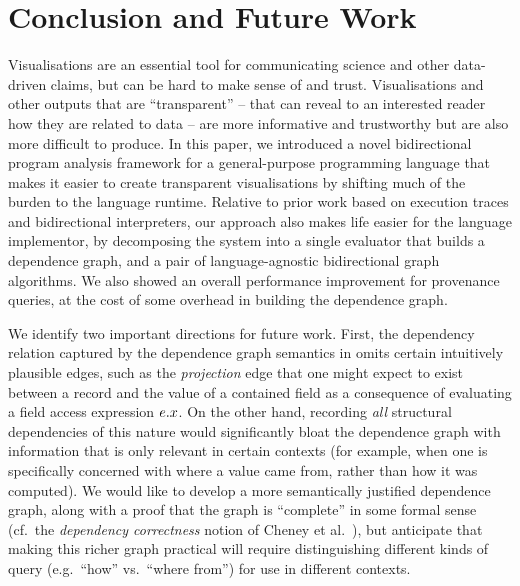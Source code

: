 \section{Conclusion and Future Work}
\label{sec:conclusion}

Visualisations are an essential tool for communicating science and other data-driven claims, but can be hard
to make sense of and trust. Visualisations and other outputs that are ``transparent'' -- that can reveal to an
interested reader how they are related to data -- are more informative and trustworthy but are also more difficult
to produce. In this paper, we introduced a novel bidirectional program analysis framework for a
general-purpose programming language that makes it easier to create transparent visualisations by shifting
much of the burden to the language runtime. Relative to prior work based on execution traces and bidirectional
interpreters, our approach also makes life easier for the language implementor, by decomposing the system into
a single evaluator that builds a dependence graph, and a pair of language-agnostic bidirectional graph
algorithms. We also showed an overall performance improvement for provenance queries, at the cost of some
overhead in building the dependence graph.


We identify two important directions for future work. First, the dependency relation captured by the
dependence graph semantics in  omits certain intuitively plausible edges, such as the
\emph{projection} edge that one might expect to exist between a record and the value of a contained field as a
consequence of evaluating a field access expression $e.x$. On the other hand, recording
\emph{all} structural dependencies of this nature would significantly bloat the dependence graph with
information that is only relevant in certain contexts (for example, when one is specifically concerned with
where a value came from, rather than how it was computed). We would like to develop a more semantically
justified dependence graph, along with a proof that the graph is ``complete'' in some formal sense (cf.~the
\emph{dependency correctness} notion of Cheney et al.~\cite{cheney11b}), but anticipate that making this
richer graph practical will require distinguishing different kinds of query (e.g.~``how'' vs.~``where from'')
for use in different contexts.

